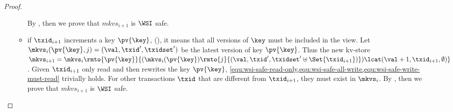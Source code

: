 \begin{proof}
\begin{itemize}
\begin{itemize}
                    By \ih, then we prove that \( mkvs_{i+1} \) is \( \WSI \) safe.
                \item if \( \txid_{i+1}\) increments a key \( \pv{\key} \), \ie \ctrinc(\pv{\key}),
                    it means that all versions of \( \key \) must be included in the view.
                    Let \( \mkvs_i(\pv{\key},j) = (\val, \txid', \txidset') \) be the latest version of key \( \pv{\key} \).
                    Thus the new kv-store \( \mkvs_{i+1} = \mkvs_{i}\rmto{\pv{\key}}{( \mkvs_i(\pv{\key})\rmto{j}{(\val, \txid', \txidset' \uplus \Set{\txid_{i+1}})} ) \lcat (\val+1, \txid_{i+1}, \emptyset) } \).
                    Given \( \txid_{i+1} \) only read and then rewrites the key \( \pv{\key} \), \cref{equ:wsi-safe-read-only,equ:wsi-safe-all-write,equ:wsi-safe-write-must-read} trivially holds.
                    For other transactions \( \txid \) that are different from \( \txid_{i+1} \), they must exist in \( \mkvs_i \).
                    By \ih, then we prove that \( mkvs_{i+1} \) is \( \WSI \) safe.
            \end{itemize}
    \end{itemize}
\end{proof}

